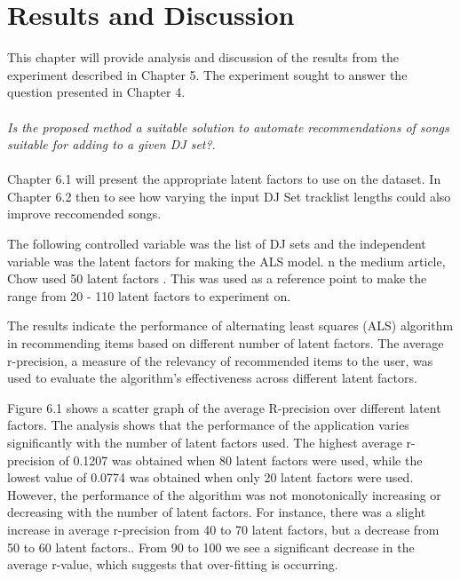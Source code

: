 
\graphicspath{{Chapter6/}}

\chapter{Results and Discussion}

This chapter will provide analysis and discussion of the results from the experiment described
in Chapter 5. The experiment sought to answer the question presented in Chapter 4.
\\
\\
\textit{Is the proposed method a suitable solution to automate recommendations of songs suitable for adding to a given DJ set?}.
\\
\\


Chapter 6.1 will present the appropriate latent factors to use on the dataset. In Chapter 6.2 then to see how varying the input DJ Set tracklist lengths could also improve reccomended songs.

The following controlled variable was the list of DJ sets and the independent variable was the latent factors for making the ALS model. n the medium article, Chow used 50 latent factors \citep{chow_music_2020}. This was used as a reference point to make the range from 20 - 110 latent factors to experiment on.

The results indicate the performance of alternating least squares (ALS) algorithm in recommending items based on different number of latent factors. The average r-precision, a measure of the relevancy of recommended items to the user, was used to evaluate the algorithm's effectiveness across different latent factors.

Figure 6.1 shows a scatter graph of the average R-precision over different latent factors. The analysis shows that the performance of the application varies significantly with the number of latent factors used. The highest average r-precision of 0.1207 was obtained when 80 latent factors were used, while the lowest value of 0.0774 was obtained when only 20 latent factors were used. However, the performance of the algorithm was not monotonically increasing or decreasing with the number of latent factors. For instance, there was a slight increase in average r-precision from 40 to 70 latent factors, but a decrease from 50 to 60 latent factors.. From 90 to 100 we see a significant decrease in the average r-value, which suggests that over-fitting is occurring.

